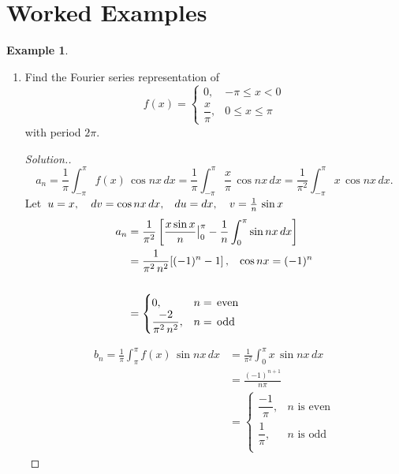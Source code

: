 \documentclass[12pt,a4paper]{report}
\theoremstyle{definition}
\newtheorem{exa}[thm]{Example}
\theoremstyle{plain}
\begin{document}
\section{Worked Examples}

\begin{exa}
\begin{enumerate}
\item[(a).] Find the Fourier series representation of  $$f(x) = \begin{cases}
                                                                 0, & -\pi \leq x < 0\\
                                                                 \dfrac{x}{\pi}, & 0 \leq x \leq \pi
                                                                \end{cases}$$
with period $2\pi.$

\begin{proof}[Solution.]
$$a_n  = \frac{1}{\pi}\int_{-\pi}^{\pi}f(x)\, \cos nx\, dx = \frac{1}{\pi}\int_{-\pi}^{\pi}\frac{x}{\pi}\, \cos nx\, dx = \frac{1}{\pi^2}\int_{-\pi}^{\pi}x\, \cos nx\, dx.$$
Let $\, u = x, \, \hspace{0.3cm} dv = \cos nx\, dx, \hspace{0.3cm} du = dx, \, \hspace{0.3cm} v  = \frac{1}{n}\, \sin x$
\begin{align*}
a_n & = \frac{1}{\pi^2}\left[\frac{x\sin x}{n}\big|^{\pi}_0 - \frac{1}{n}\int_0^{\pi}\sin nx\, dx\right]\\
    & = \frac{1}{\pi^2\, n^2}[(-1)^n - 1]\, , \hspace{0.3cm} \cos nx = (-1)^n\\\\
    & = \begin{cases}
        0, & n = \, \text{even}\\
        \dfrac{-2}{\pi^2\, n^2}, & n = \, \text{odd}
        \end{cases}
\end{align*}

\begin{align*}
b_n  = \frac{1}{\pi}\int_{\pi}^{\pi}f(x)\, \sin nx\, dx
    &  = \frac{1}{\pi^2}\int_0^{\pi}x\, \sin nx\, dx\\
    & = \frac{(-1)^{n + 1}}{n\pi}\\
    & = \begin{cases}
         \dfrac{-1}{\pi}, & n \, \, \text{is even}\\
         \dfrac{1}{\pi},  & n\,  \, \text{is odd}\\
        \end{cases}
\end{align*}



\end{proof}
\end{enumerate}
\end{exa}
\end{document}
